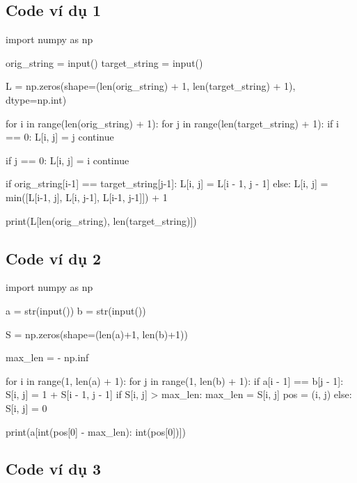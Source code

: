 \documentclass[14pt, a4paper]{article}
\theoremstyle{sltheorem}
\theoremstyle{soltheorem}
\begin{document}
    \subsection{Code ví dụ 1} \label{code-1-ex-2}

    \begin{python}
import numpy as np
        
orig_string = input()
target_string = input()
        
L = np.zeros(shape=(len(orig_string) + 1, len(target_string) + 1), dtype=np.int)
        
        
for i in range(len(orig_string) + 1):
    for j in range(len(target_string) + 1):
        if i == 0:
            L[i, j] = j
            continue
        
        if j == 0:
            L[i, j] = i
            continue
        
        if orig_string[i-1] == target_string[j-1]:
            L[i, j] = L[i - 1, j - 1]
        else:
            L[i, j] = min([L[i-1, j], L[i, j-1], L[i-1, j-1]]) + 1
        
        
print(L[len(orig_string), len(target_string)])
                \end{python}

    \subsection{Code ví dụ 2} \label{code-2-ex-1}

    \begin{python}

import numpy as np
        
a = str(input())
b = str(input())
        
        
S = np.zeros(shape=(len(a)+1, len(b)+1))
        
max_len = - np.inf
        
for i in range(1, len(a) + 1):
    for j in range(1, len(b) + 1):
        if a[i - 1] == b[j - 1]:
            S[i, j] = 1 + S[i - 1, j - 1]
            if S[i, j] > max_len:
                max_len = S[i, j]
                pos = (i, j)
        else:
            S[i, j] = 0
        
        
print(a[int(pos[0] - max_len): int(pos[0])])

    \end{python}

    \subsection{Code ví dụ 3} \label{code-3-ex-1}
\end{document}
